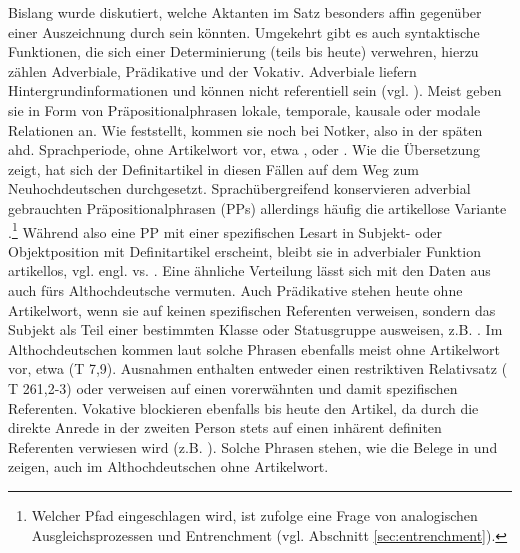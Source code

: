 Bislang wurde diskutiert, welche Aktanten im Satz besonders affin gegenüber einer Auszeichnung durch  sein könnten. Umgekehrt gibt es auch syntaktische Funktionen, die sich einer Determinierung (teils bis heute) verwehren, hierzu zählen Adverbiale, Prädikative und der Vokativ. Adverbiale liefern Hintergrundinformationen und können nicht referentiell sein (vgl. ). Meist geben sie in Form von Präpositionalphrasen lokale, temporale, kausale oder modale Relationen an. Wie \textcite[84]{Oubouzar1992} feststellt, kommen sie noch bei Notker, also in der späten ahd. Sprachperiode, ohne Artikelwort vor, etwa  ,   oder   \parencite[vgl. auch][76]{Szczepaniak2011a}. Wie die Übersetzung zeigt, hat sich der Definitartikel in diesen Fällen auf dem Weg zum Neuhochdeutschen durchgesetzt. Sprachübergreifend konservieren adverbial gebrauchten Präpositionalphrasen (PPs) allerdings häufig die artikellose Variante \parencite{Himmelmann1998}.\footnote{Welcher Pfad eingeschlagen wird, ist \textcite[342 und 344f.]{Himmelmann1998} zufolge eine Frage von analogischen Ausgleichsprozessen und Entrenchment (vgl. Abschnitt \ref{sec:entrenchment}).} Während also eine PP mit einer spezifischen Lesart in Subjekt- oder Objektposition mit Definitartikel erscheint, bleibt sie in adverbialer Funktion artikellos, vgl. engl.  vs.  \parencite[332]{Himmelmann1998}. Eine ähnliche Verteilung lässt sich mit den Daten aus \textcite[84f.]{Oubouzar1992} auch fürs Althochdeutsche vermuten. Auch Prädikative stehen heute ohne Artikelwort, wenn sie auf keinen spezifischen Referenten verweisen, sondern das Subjekt als Teil einer bestimmten Klasse oder Statusgruppe ausweisen, z.B.  \parencite[vgl.][218]{DAvis2013}. Im Althochdeutschen kommen laut \textcite[6-8]{Graf1905} solche Phrasen ebenfalls meist ohne Artikelwort vor, etwa  (T 7,9). Ausnahmen enthalten entweder einen restriktiven Relativsatz ( T 261,2-3) oder verweisen auf einen  vorerwähnten und damit spezifischen Referenten. Vokative blockieren ebenfalls bis heute den Artikel, da durch die direkte Anrede in der zweiten Person stets auf einen inhärent definiten Referenten verwiesen wird (z.B. ). Solche Phrasen stehen, wie die Belege in \textcite[13]{Graf1905} und \textcite[40]{Bell1907} zeigen, auch im Althochdeutschen ohne Artikelwort. 

